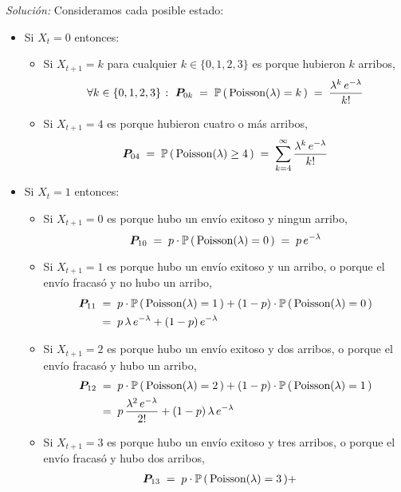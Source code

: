 \documentclass[ a4paper, twoside, 11pt]{article}
\begin{document}
\begin{problem}
\emph{Soluci\'on:} Consideramos cada posible estado: 
\begin{itemize}
\item Si $X_t = 0$ entonces: 
\begin{itemize}
\item Si $X_{t+1} = k$ para cualquier $k \in \{ 0, 1, 2, 3 \}$ es porque hubieron $k$ arribos, \iec
\[
\forall k \in \{ 0, 1, 2, 3 \} \; \colon \;
{\boldsymbol{P}}_{0k} \; = \;
\mathbb{P} \, ( \, \text{Poisson}(\lambda) = k \, ) \; = \; 
\frac{ \lambda^k \, e^{-\lambda} }{k!}
\]
\item Si $X_{t+1} = 4$ es porque hubieron cuatro o m\'as arribos, \iec
\[
{\boldsymbol{P}}_{04} \; = \;
\mathbb{P} \, ( \, \text{Poisson}(\lambda) \geq 4 \, ) \; = \; 
\sum_{k=4}^{\infty} \frac{ \lambda^k \, e^{-\lambda} }{k!}
\]
\end{itemize}
\item Si $X_t = 1$ entonces: 
\begin{itemize}
\item Si $X_{t+1} = 0$ es porque hubo un env\'io exitoso y ningun arribo, \iec 
\[
{\boldsymbol{P}}_{10} \; = \;
p \cdot \mathbb{P} \, ( \, \text{Poisson}(\lambda) = 0 \, ) \; = \;
p \, e^{-\lambda}
\]
\item Si $X_{t+1} = 1$ es porque hubo un env\'io exitoso y un arribo, o porque el env\'io fracas\'o y no hubo un arribo, \iec 
\begin{align*}
{\boldsymbol{P}}_{11} \; 
& = \; p \cdot \mathbb{P} \, ( \, \text{Poisson}(\lambda) = 1 \, ) +
(1-p) \cdot \mathbb{P} \, ( \, \text{Poisson}(\lambda) = 0 \, ) \\
& = \; p \, \lambda \, e^{-\lambda} + (1-p) \, e^{-\lambda}
\end{align*}
\item Si $X_{t+1} = 2$ es porque hubo un env\'io exitoso y dos arribos, o porque el env\'io fracas\'o y hubo un arribo, \iec 
\begin{align*}
{\boldsymbol{P}}_{12} \; 
& = \; p \cdot \mathbb{P} \, ( \, \text{Poisson}(\lambda) = 2 \, ) +
(1-p) \cdot \mathbb{P} \, ( \, \text{Poisson}(\lambda) = 1 \, ) \\
& = \; p \, \frac{\lambda^2 \, e^{-\lambda}}{2!} 
+ (1-p) \, \lambda \, e^{-\lambda}
\end{align*}
\item Si $X_{t+1} = 3$ es porque hubo un env\'io exitoso y tres arribos, o porque el env\'io fracas\'o y hubo dos arribos, \iec 
\begin{align*}
\vec{P}_{13} \; 
& = \; p \cdot \Pr \, ( \, \Poisson(\lambda) = 3 \, ) +

\end{align*}
\end{itemize}
\end{itemize}
\end{problem}
\end{document}
